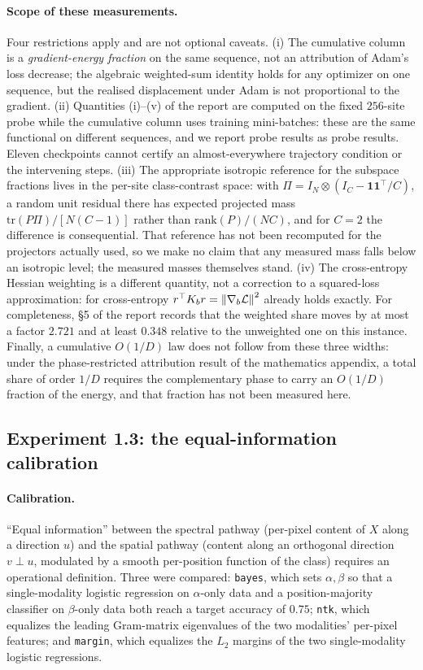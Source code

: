 \paragraph{Scope of these measurements.} Four restrictions apply and are not
optional caveats. (i) The cumulative column is a \emph{gradient-energy
fraction} on the same sequence, not an attribution of Adam's loss decrease;
the algebraic weighted-sum identity holds for any optimizer on one sequence,
but the realised displacement under Adam is not proportional to the gradient.
(ii) Quantities (i)--(v) of the report are computed on the fixed $256$-site
probe while the cumulative column uses training mini-batches: these are the
same functional on different sequences, and we report probe results as probe
results. Eleven checkpoints cannot certify an almost-everywhere trajectory
condition or the intervening steps. (iii) The appropriate isotropic reference
for the subspace fractions lives in the per-site class-contrast space: with
$\Pi = I_N \otimes (I_C - \mathbf{1}\mathbf{1}^\top/C)$, a random unit residual
there has expected projected mass $\mathrm{tr}(P\Pi)/[N(C-1)]$ rather than
$\mathrm{rank}(P)/(NC)$, and for $C = 2$ the difference is consequential. That
reference has not been recomputed for the projectors actually used, so we make
no claim that any measured mass falls below an isotropic level; the measured
masses themselves stand. (iv) The cross-entropy Hessian weighting is a
different quantity, not a correction to a squared-loss approximation: for
cross-entropy $r^\top K_b r = \left\lVert\nabla_b\mathcal{L}\right\rVert^2$ already holds exactly.
For completeness, \S5 of the report records that the weighted share moves by
at most a factor $2.721$ and at least $0.348$ relative to the unweighted one on
this instance. Finally, a cumulative $O(1/D)$ law does not follow from these
three widths: under the phase-restricted attribution result of the mathematics
appendix, a total share of order $1/D$ requires the complementary phase to
carry an $O(1/D)$ fraction of the energy, and that fraction has not been
measured here.

\subsection{Experiment 1.3: the equal-information calibration}
\label{app:exp13}

\paragraph{Calibration.} ``Equal information'' between the spectral pathway
(per-pixel content of $X$ along a direction $u$) and the spatial pathway
(content along an orthogonal direction $v \perp u$, modulated by a smooth
per-position function of the class) requires an operational definition. Three
were compared: \texttt{bayes}, which sets $\alpha, \beta$ so that a
single-modality logistic regression on $\alpha$-only data and a
position-majority classifier on $\beta$-only data both reach a target accuracy
of $0.75$; \texttt{ntk}, which equalizes the leading Gram-matrix eigenvalues of
the two modalities' per-pixel features; and \texttt{margin}, which equalizes
the $L_2$ margins of the two single-modality logistic regressions.

